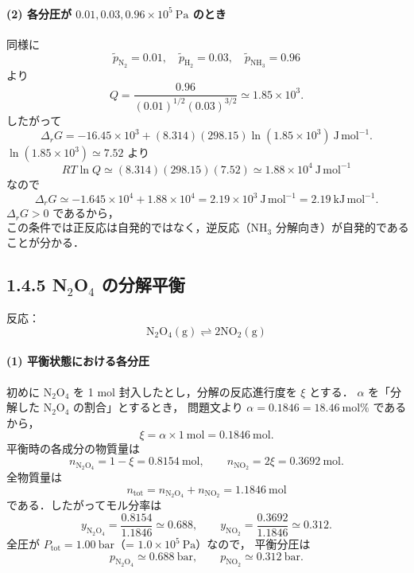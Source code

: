 \documentclass[a4paper,12pt]{jlreq}
\begin{document}
\paragraph{(2) 各分圧が \(0.01, 0.03, 0.96\times10^5\ \mathrm{Pa}\) のとき}

同様に
\[
 \tilde p_{\mathrm{N_2}} = 0.01,\quad
 \tilde p_{\mathrm{H_2}} = 0.03,\quad
 \tilde p_{\mathrm{NH_3}} = 0.96
\]
より
\[
 Q
 = \frac{0.96}{(0.01)^{1/2}(0.03)^{3/2}}
 \simeq 1.85\times10^3.
\]
したがって
\[
 \Delta_r G
 = -16.45\times10^3
   + (8.314)(298.15)\ln(1.85\times10^3)\ \mathrm{J\,mol^{-1}}.
\]
\(\ln(1.85\times10^3)\simeq 7.52\) より
\[
 RT\ln Q
 \simeq (8.314)(298.15)(7.52)
 \simeq 1.88\times10^4\ \mathrm{J\,mol^{-1}}
\]
なので
\[
 \Delta_r G
 \simeq -1.645\times10^4 + 1.88\times10^4
 = 2.19\times10^3\ \mathrm{J\,mol^{-1}}
 = 2.19\ \mathrm{kJ\,mol^{-1}}.
\]
\(\Delta_r G>0\) であるから，
\[
 \boxed{\text{この条件では正反応は自発的ではなく，逆反応（NH\(_3\) 分解向き）が自発的である}}
\]
ことが分かる．


\subsection*{1.4.5 N\texorpdfstring{$_2$}{2}O\texorpdfstring{$_4$}{4} の分解平衡}

反応：
\[
 \mathrm{N_2O_4(g)} \rightleftharpoons 2\mathrm{NO_2(g)}
\]

\paragraph{(1) 平衡状態における各分圧}

初めに \(\mathrm{N_2O_4}\) を 1 mol 封入したとし，分解の反応進行度を \(\xi\) とする．
\(\alpha\) を「分解した \(\mathrm{N_2O_4}\) の割合」とするとき，
問題文より \(\alpha = 0.1846 = 18.46~\mathrm{mol\%}\) であるから，
\[
 \xi = \alpha \times 1\ \mathrm{mol} = 0.1846\ \mathrm{mol}.
\]
平衡時の各成分の物質量は
\[
 n_{\mathrm{N_2O_4}} = 1 - \xi = 0.8154\ \mathrm{mol},
\qquad
 n_{\mathrm{NO_2}} = 2\xi = 0.3692\ \mathrm{mol}.
\]
全物質量は
\[
 n_{\mathrm{tot}} = n_{\mathrm{N_2O_4}} + n_{\mathrm{NO_2}}
 = 1.1846\ \mathrm{mol}
\]
である．したがってモル分率は
\[
 y_{\mathrm{N_2O_4}} = \frac{0.8154}{1.1846} \simeq 0.688,
\qquad
 y_{\mathrm{NO_2}} = \frac{0.3692}{1.1846} \simeq 0.312.
\]
全圧が \(P_{\mathrm{tot}} = 1.00\ \mathrm{bar}\)（= \(1.0\times10^5\ \mathrm{Pa}\)）なので，
平衡分圧は
\[
 \boxed{
 p_{\mathrm{N_2O_4}} \simeq 0.688\ \mathrm{bar},\qquad
 p_{\mathrm{NO_2}} \simeq 0.312\ \mathrm{bar}
 }.
\]
\end{document}
